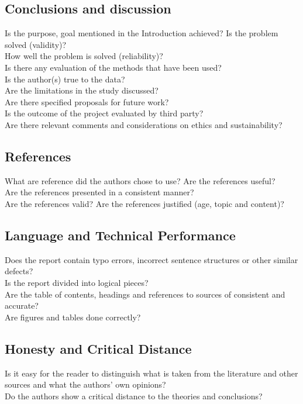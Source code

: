 \documentclass[11pt,a4paper]{article}
\begin{document}
\subsection*{Conclusions and discussion}
Is the purpose, goal mentioned in the Introduction achieved? Is the problem solved (validity)? \\
How well the problem is solved (reliability)? \\
Is there any evaluation of the methods that have been used?\\
Is the author(s) true to the data?\\
Are the limitations in the study discussed?\\
Are there specified proposals for future work?\\
Is the outcome of the project evaluated by third party?\\ 
Are there relevant comments and considerations on ethics and sustainability?

\subsection*{References}
What are reference did the authors chose to use? Are the references useful?\\
Are the references presented in a consistent manner?\\
Are the references valid? Are the references justified (age, topic and content)?

\subsection*{Language and Technical Performance}
Does the report contain typo errors, incorrect sentence structures or other similar defects?\\
Is the report divided into logical pieces?\\
Are the table of contents, headings and references to sources of consistent and accurate?\\
Are figures and tables done correctly?

\subsection*{Honesty and Critical Distance}
Is it easy for the reader to distinguish what is taken from the literature and other sources and what the authors’ own opinions?\\
Do the authors show a critical distance to the theories and conclusions?
\end{document}
